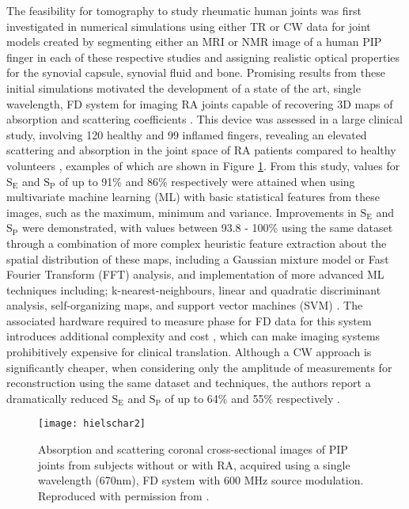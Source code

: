 \documentclass[twoside]{bhamthesis}
\theoremstyle{definition}
\begin{document}
The feasibility for tomography to study rheumatic human joints was first investigated in numerical simulations using either TR \cite{klose1998} or CW \cite{netz2001imaging} data for joint models created by segmenting either an MRI or NMR image of a human PIP finger in each of these respective studies and assigning realistic optical properties for the synovial capsule, synovial fluid and bone. Promising results from these initial simulations motivated the development of a state of the art, single wavelength, FD system for imaging RA joints capable of recovering 3D maps of absorption and scattering coefficients \cite{hielscher2004sagittal,netz2008multipixel}. This device was assessed in a large clinical study, involving 120 healthy and 99 inflamed fingers, revealing an elevated scattering and absorption in the joint space of RA patients compared to healthy volunteers \cite{hielscher2011frequency}, examples of which are shown in Figure \ref{fig:Hielschar_results}. From this study, values for $\mathrm{S_E}$ and $\mathrm{S_P}$ of up to 91\% and 86\% respectively were attained when using multivariate machine learning (ML) with basic statistical features from these images, such as the maximum, minimum and variance. Improvements in $\mathrm{S_E}$ and $\mathrm{S_P}$ were demonstrated, with values between 93.8 - 100\% \cite{montejo2013computer2} using the same dataset through a combination of more complex heuristic feature extraction about the spatial distribution of these maps, including a Gaussian mixture model or Fast Fourier Transform (FFT) analysis, and implementation of more advanced ML techniques including; k-nearest-neighbours, linear and quadratic discriminant analysis, self-organizing maps, and support vector machines (SVM) \cite{montejo2013computer}. The associated hardware required to measure phase for FD data for this system introduces additional complexity and cost \cite{netz2008multipixel}, which can make imaging systems prohibitively expensive for clinical translation. Although a CW approach is significantly cheaper, when considering only the amplitude of measurements for reconstruction using the same dataset and techniques, the authors report a dramatically reduced $\mathrm{S_E}$ and $\mathrm{S_P}$ of up to 64\% and 55\% respectively \cite{montejo2013computer2}.

\begin{figure}[!ht]
\texttt{[image: hielschar2]}
\centering
\caption{Absorption and scattering coronal cross-sectional images of PIP joints from subjects without or with RA, acquired using a single wavelength (670nm), FD system with 600 MHz source modulation. Reproduced with permission from \cite{hielscher2011frequency}.}
\centering
\label{fig:Hielschar_results}
\end{figure} 
\end{document}
